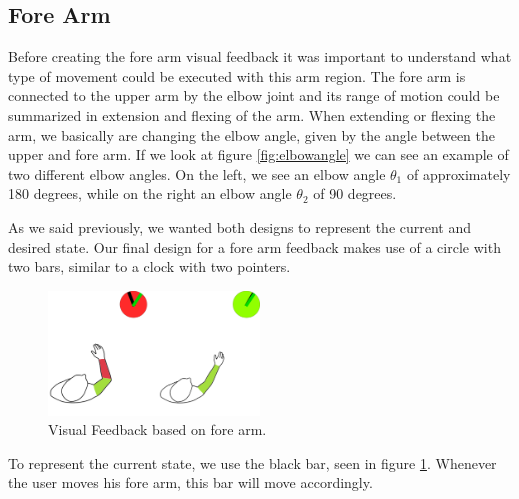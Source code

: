 \subsection{Fore Arm}

Before creating the fore arm visual feedback it was important to understand what type of movement could be executed with this arm region.
The fore arm is connected to the upper arm by the elbow joint and its range of motion could be summarized in extension and flexing of the arm.
When extending or flexing the arm, we basically are changing the elbow angle, given by the angle between the upper and fore arm.
If we look at figure \ref{fig:elbowangle} we can see an example of two different elbow angles. On the left, we see an elbow angle $\theta$$_1$ of approximately 180 degrees, while on the right an elbow angle $\theta$$_2$ of 90 degrees.  

As we said previously, we wanted both designs to represent the current and desired state. Our final design for a fore arm feedback makes use of a circle with two bars, similar to a clock with two pointers.


\begin{figure}[!t]
    \begin{center}
        \includegraphics[width=0.5\textwidth]{imgs/forearmfeedback.png}
    \end{center}
    \caption{Visual Feedback based on fore arm.}
    \label{fig:forearmfeedback}
\end{figure}

To represent the current state, we use the black bar, seen in figure \ref{fig:forearmfeedback}. Whenever the user moves his fore arm, this bar will move accordingly.


